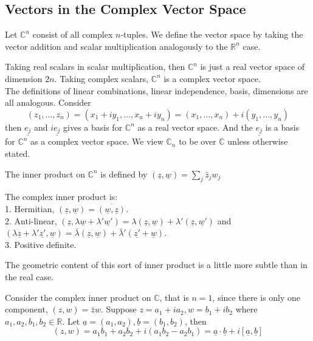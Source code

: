 \subsection{Vectors in the Complex Vector Space}
\begin{definition}
    Let $\mathbb C^n$ consist of all complex $n$-tuples.
    We define the vector space by taking the vector addition and scalar multiplication analogously to the $\mathbb R^n$ case.
\end{definition}
Taking real scalars in scalar multiplication, then $\mathbb C^n$ is just a real vector space of dimension $2n$.
Taking complex scalars, $\mathbb C^n$ is a complex vector space.\\
The definitions of linear combinations, linear independence, basis, dimensions are all analogous.
Consider
$$(z_1,\ldots,z_n)=(x_1+iy_1,\ldots,x_n+iy_n)=(x_1,\ldots,x_n)+i(y_1,\ldots,y_n)$$
then $\underline{e_j}$ and $i\underline{e_j}$ gives a basis for $\mathbb C^n$ as a real vector space.
And the $\underline{e_j}$ is a basis for $\mathbb C^n$ as a complex vector space.
We view $\mathbb C_n$ to be over $\mathbb C$ unless otherwise stated.
\begin{definition}
    The inner product on $\mathbb C^n$ is defined by
    $(\underline{z},\underline{w})=\sum_{j}\bar{z}_jw_j$
\end{definition}
\begin{proposition}
    The complex inner product is:\\
    1. Hermitian, $(\underline{z},\underline{w})=\overline{(\underline{w},\underline{z})}$.\\
    2. Anti-linear, $(\underline{z},\lambda\underline{w}+\lambda'\underline{w'})=\lambda(\underline{z},\underline{w})+\lambda'(\underline{z},\underline{w'})$ and $(\lambda\underline{z}+\lambda'\underline{z'},\underline{w})=\bar\lambda(\underline{z},\underline{w})+\bar\lambda'(\underline{z'}+\underline{w})$.\\
    3. Positive definite.
\end{proposition}
The geometric content of this sort of inner product is a little more subtle than in the real case.
\begin{example}
    Consider the complex inner product on $\mathbb C$, that is $n=1$, since there is only one component, $(z,w)=\bar zw$.
    Suppose $z=a_1+ia_2,w=b_1+ib_2$ where $a_1,a_2,b_1,b_2\in\mathbb R$.
    Let $\underline{a}=(a_1,a_2),\underline{b}=(b_1,b_2)$, then
    $$(z,w)=a_1b_1+a_2b_2+i(a_1b_2-a_2b_1)=\underline{a}\cdot\underline{b}+i[\underline{a},\underline{b}]$$
\end{example}
